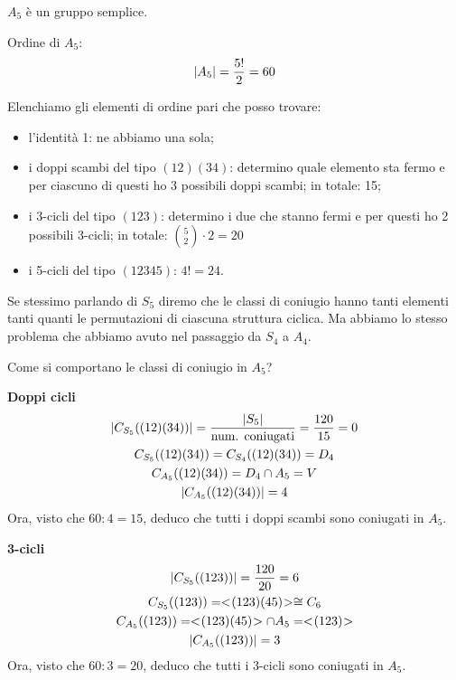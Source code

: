 \begin{teorema}
	\label{th:a5_semplice}
	$A_5$ è un gruppo semplice.
\end{teorema}

\begin{dimostrazione}
	Ordine di $A_5$:
	\begin{equation*}
		\lvert A_5 \rvert = \dfrac{5!}{2} = 60
	\end{equation*}

	Elenchiamo gli elementi di ordine pari che posso trovare:
	\begin{itemize}
		\item l'identità 1: ne abbiamo una sola;
		\item i doppi scambi del tipo $(12)(34)$: determino quale elemento sta fermo e per ciascuno di questi ho 3
		possibili doppi scambi;
		in totale: 15;
		\item i 3-cicli del tipo $(123)$: determino i due che stanno fermi e per questi ho 2 possibili 3-cicli;
		in totale: $\binom{5}{2} \cdot 2 = 20$
		\item i 5-cicli del tipo $(12345)$: $4! = 24$.
	\end{itemize}

	Se stessimo parlando di $S_5$ diremo che le classi di coniugio hanno tanti elementi tanti quanti le permutazioni
	di ciascuna struttura ciclica.
	Ma abbiamo lo stesso problema che abbiamo avuto nel passaggio da $S_4$ a $A_4$.

	Come si comportano le classi di coniugio in $A_5$?

	\textbf{Doppi cicli}
	\begin{gather*}
		\lvert C_{S_5}((12)(34)) \rvert = \dfrac{\lvert S_5 \rvert}{\text{num. coniugati}} = \dfrac{120}{15} = 0 \\
		C_{S_5}((12)(34)) = C_{S_4}((12)(34)) = D_4 \\
		C_{A_5}((12)(34)) = D_4 \cap A_5 = V \\
		\lvert C_{A_5}((12)(34)) \rvert = 4
	\end{gather*}
	Ora, visto che $60 : 4 = 15$, deduco che tutti i doppi scambi sono coniugati in $A_5$.

	\textbf{3-cicli}
	\begin{gather*}
		\lvert C_{S_5}((123)) \rvert = \dfrac{120}{20} = 6 \\
		C_{S_5}((123)) = < \negmedspace (123)(45) \negmedspace > \cong C_6 \\
		C_{A_5}((123)) = < \negmedspace (123)(45) \negmedspace > \cap A_5 = < \negmedspace (123) \negmedspace > \\
		\lvert C_{A_5}((123)) \rvert = 3
	\end{gather*}
	Ora, visto che $60 : 3 = 20$, deduco che tutti i 3-cicli sono coniugati in $A_5$.


\end{dimostrazione}
